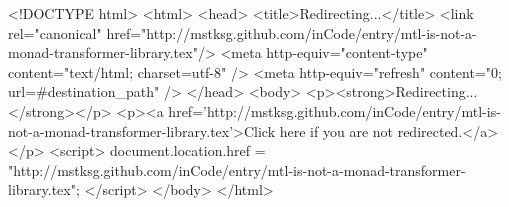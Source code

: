 <!DOCTYPE html>
<html>
<head>
<title>Redirecting...</title>
<link rel="canonical" href="http://mstksg.github.com/inCode/entry/mtl-is-not-a-monad-transformer-library.tex"/>
<meta http-equiv="content-type" content="text/html; charset=utf-8" />
<meta http-equiv="refresh" content="0; url=#{destination_path}" />
</head>
<body>
  <p><strong>Redirecting...</strong></p>
  <p><a href='http://mstksg.github.com/inCode/entry/mtl-is-not-a-monad-transformer-library.tex'>Click here if you are not redirected.</a></p>
  <script>
    document.location.href = "http://mstksg.github.com/inCode/entry/mtl-is-not-a-monad-transformer-library.tex";
  </script>
</body>
</html>
